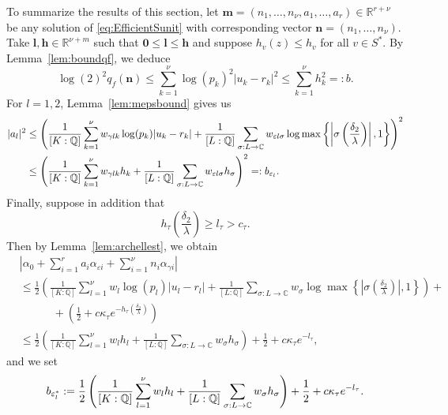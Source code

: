 To summarize the results of this section, let $\mathbf{m} = (n_1, \dots, n_{\nu}, a_1, \dots, a_r) \in \mathbb{R}^{r + \nu}$ be any solution of \eqref{eq:EfficientSunit} with corresponding vector $\mathbf{n} = (n_1, \dots, n_{\nu})$. Take $\mathbf{l},\mathbf{h}\in\mathbb{R}^{\nu+m}$ such that $\mathbf{0} \leq \mathbf{l} \leq \mathbf{h}$ and suppose $h_v(z)\leq h_v$ for all $v\in S^*$. By Lemma~\ref{lem:boundqf}, we deduce
\begin{equation} \label{def:bbound}
\log(2)^2q_f(\mathbf{n}) \leq \sum_{k = 1}^{\nu} \log(p_k)^2|u_k -r_k|^2 \leq \sum_{k = 1}^{\nu} h_k^2=:b.
\end{equation}
For $l = 1, 2$, Lemma~\ref{lem:mepsbound} gives us
\begin{align}\label{def:bepsbound}
|a_l|^2 &\leq \left( \frac{1}{[K:\mathbb{Q}]}\sum_{k = 1}^{\nu} w_{\gamma l k}\log(p_k)|u_k - r_k| + \frac{1}{[L:\mathbb{Q}]}\sum_{\sigma :L \to \mathbb{C}} w_{\varepsilon l \sigma}\log \max \left\{ \left|\sigma\left(\frac{\delta_2}{\lambda}\right)\right|, 1\right\} \right)^2\\
	&\leq \left( \frac{1}{[K:\mathbb{Q}]}\sum_{k = 1}^{\nu} w_{\gamma l k}h_k + \frac{1}{[L:\mathbb{Q}]}\sum_{\sigma:L\to \mathbb{C}} w_{\varepsilon l \sigma}h_{\sigma}\right)^2 =: b_{\varepsilon_l}.
\end{align}
Finally, suppose in addition that
\[h_{\tau}\left(\frac{\delta_2}{\lambda}\right) \geq l_{\tau} > c_{\tau}.\]
Then by Lemma~\ref{lem:archellest}, we obtain
\begin{align*}
&\left|\alpha_0+\sum_{i = 1}^r a_i \alpha_{\varepsilon i} + \sum_{i = 1}^{\nu} n_i \alpha_{\gamma i}\right|\\
	& \leq \frac{1}{2}\left(\frac{1}{[K:\mathbb{Q}]}\sum_{l = 1}^{\nu}w_l \log(p_l)|u_l - r_l| + \frac{1}{[L:\mathbb{Q}]}\sum_{\sigma :L \to \mathbb{C}} w_{\sigma}\log \max \left\{ \left|\sigma\left(\frac{\delta_2}{\lambda}\right)\right|, 1\right\} \right) + \\
	& \quad \quad \quad + \left(\frac{1}{2} + c\kappa_{\tau}e^{-h_{\tau}\left(\frac{\delta_2}{\lambda}\right)}\right)\\
	& \leq \frac{1}{2}\left(\frac{1}{[K:\mathbb{Q}]}\sum_{l = 1}^{\nu}w_l h_l + \frac{1}{[L:\mathbb{Q}]}\sum_{\sigma :L \to \mathbb{C}} w_{\sigma}h_{\sigma} \right) + \frac{1}{2} + c\kappa_{\tau}e^{-l_{\tau}}, 
\end{align*} 
and we set
\begin{equation} \label{def:bepstarbound}
b_{\varepsilon_l^*}:= \frac{1}{2}\left(\frac{1}{[K:\mathbb{Q}]}\sum_{l = 1}^{\nu}w_l h_l + \frac{1}{[L:\mathbb{Q}]}\sum_{\sigma :L \to \mathbb{C}} w_{\sigma}h_{\sigma} \right) + \frac{1}{2} + c\kappa_{\tau}e^{-l_{\tau}}.
\end{equation}

